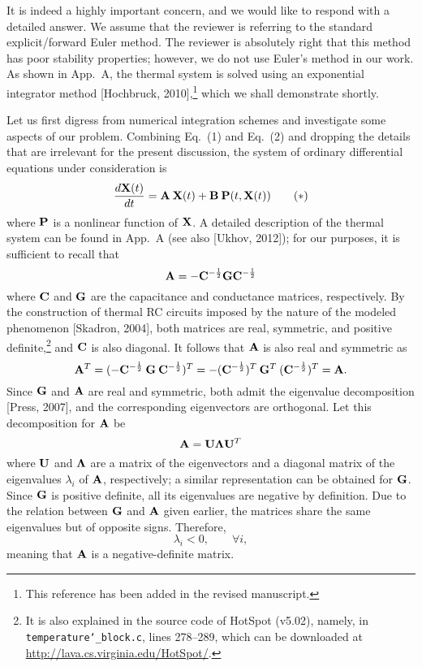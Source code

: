 \begin{authors}
It is indeed a highly important concern, and we would like to respond with a detailed answer.
We assume that the reviewer is referring to the standard explicit/forward Euler method.
The reviewer is absolutely right that this method has poor stability properties; however, we do not use Euler's method in our work.
As shown in App.~A, the thermal system is solved using an exponential integrator method [Hochbruck, 2010],\footnote{This reference has been added in the revised manuscript.} which we shall demonstrate shortly.

Let us first digress from numerical integration schemes and investigate some aspects of our problem.
Combining Eq.~(1) and Eq.~(2) and dropping the details that are irrelevant for the present discussion, the system of ordinary differential equations under consideration is
\begin{equation}
  \frac{d\vX(\t)}{d\t} = \mA \: \vX(\t) + \mB \: \vP(\t, \vX(\t)) \tag{$\ast$}
\end{equation}
where $\mathbf{P}$ is a nonlinear function of $\mathbf{X}$.
A detailed description of the thermal system can be found in App.~A (see also [Ukhov, 2012]); for our purposes, it is sufficient to recall that
\[
  \mA = -\mC^{-\frac{1}{2}} \mG \mC^{-\frac{1}{2}}
\]
where $\mC$ and $\mG$ are the capacitance and conductance matrices, respectively.
By the construction of thermal RC circuits imposed by the nature of the modeled phenomenon [Skadron, 2004], both matrices are real, symmetric, and positive definite,\footnote{It is also explained in the source code of HotSpot (v5.02), namely, in \texttt{temperature\char`_block.c}, lines 278--289, which can be downloaded at \url{http://lava.cs.virginia.edu/HotSpot/}.} and $\mC$ is also diagonal.
It follows that $\mA$ is also real and symmetric as
\[
  \mA^T = (-\mC^{-\frac{1}{2}} \: \mG \: \mC^{-\frac{1}{2}})^T = -(\mC^{-\frac{1}{2}})^T \: \mG^T \: (\mC^{-\frac{1}{2}})^T = \mA.
\]
Since $\mG$ and $\mA$ are real and symmetric, both admit the eigenvalue decomposition [Press, 2007], and the corresponding eigenvectors are orthogonal.
Let this decomposition for $\mA$ be
\[
    \mA = \m{U} \m{\Lambda} \m{U}^T
\]
where $\m{U}$ and $\m{\Lambda}$ are a matrix of the eigenvectors and a diagonal matrix of the eigenvalues $\lambda_i$ of $\mA$, respectively; a similar representation can be obtained for $\mG$.
Since $\mG$ is positive definite, all its eigenvalues are negative by definition.
Due to the relation between $\mG$ and $\mA$ given earlier, the matrices share the same eigenvalues but of opposite signs.
Therefore,
\[
  \lambda_i < 0, \qquad \forall i,
\]
meaning that $\mA$ is a negative-definite matrix.


\end{authors}

